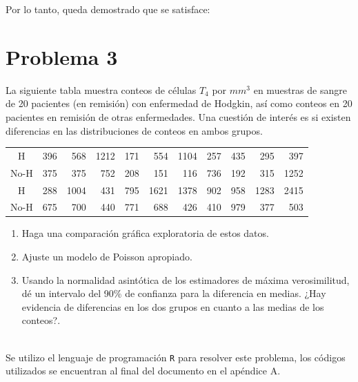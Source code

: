 Por lo tanto, queda demostrado que se satisface:

\begin{center}
\end{center}

\newpage

\section*{Problema \textcolor{CIMATRed}{3}}

La siguiente tabla muestra conteos de células $T_4$ por $mm^3$ en muestras de sangre de 20 pacientes (en remisión) con enfermedad de Hodgkin, así como conteos en 20 pacientes en remisión de otras enfermedades. Una cuestión de interés es si existen diferencias en las distribuciones de conteos en ambos grupos.

\begin{center}
\begin{tabular}{|c|rrrrrrrrrr|}
\hline
H    & 396 & 568  & 1212 & 171 & 554  & 1104 & 257 & 435 & 295  & 397  \\
No-H & 375 & 375  & 752  & 208 & 151  & 116  & 736 & 192 & 315  & 1252 \\
H    & 288 & 1004 & 431  & 795 & 1621 & 1378 & 902 & 958 & 1283 & 2415 \\
No-H & 675 & 700  & 440  & 771 & 688  & 426  & 410 & 979 & 377  & 503  \\
\hline
\end{tabular}
\end{center}

\begin{enumerate}[label=\alph*.]
    \item Haga una comparación gráfica exploratoria de estos datos.
    \item Ajuste un modelo de Poisson apropiado.
    \item Usando la normalidad asintótica de los estimadores de máxima verosimilitud, dé un intervalo del 90\% de confianza para la diferencia en medias. ¿Hay evidencia de diferencias en los dos grupos en cuanto a las medias de los conteos?.
\end{enumerate}

\noindent{}\\

Se utilizo el lenguaje de programación \texttt{R} para resolver este problema, los códigos utilizados se encuentran al final del documento en el apéndice A.

